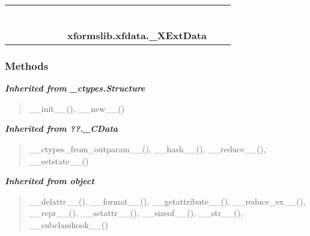     \label{xformslib:xfdata:_XExtData}
\begin{tabular}{cccccccccc}
\multicolumn{2}{r}{\settowidth{\BCL}{object}\multirow{2}{\BCL}{object}}
&&
&&
&&
  \\\cline{3-3}
  &&\multicolumn{1}{c|}{}
&&
&&
&&
  \\
\multicolumn{4}{r}{\settowidth{\BCL}{??.\_CData}\multirow{2}{\BCL}{??.\_CData}}
&&
&&
  \\\cline{5-5}
  &&&&\multicolumn{1}{c|}{}
&&
&&
  \\
\multicolumn{6}{r}{\settowidth{\BCL}{\_ctypes.Structure}\multirow{2}{\BCL}{\_ctypes.Structure}}
&&
  \\\cline{7-7}
  &&&&&&\multicolumn{1}{c|}{}
&&
  \\
&&&&&&\multicolumn{2}{l}{\textbf{xformslib.xfdata.\_XExtData}}
\end{tabular}



  \subsubsection{Methods}


\large{\textbf{\textit{Inherited from \_ctypes.Structure}}}

\begin{quote}
\_\_init\_\_(), \_\_new\_\_()
\end{quote}

\large{\textbf{\textit{Inherited from ??.\_CData}}}

\begin{quote}
\_\_ctypes\_from\_outparam\_\_(), \_\_hash\_\_(), \_\_reduce\_\_(), \_\_setstate\_\_()
\end{quote}

\large{\textbf{\textit{Inherited from object}}}

\begin{quote}
\_\_delattr\_\_(), \_\_format\_\_(), \_\_getattribute\_\_(), \_\_reduce\_ex\_\_(), \_\_repr\_\_(), \_\_setattr\_\_(), \_\_sizeof\_\_(), \_\_str\_\_(), \_\_subclasshook\_\_()
\end{quote}


